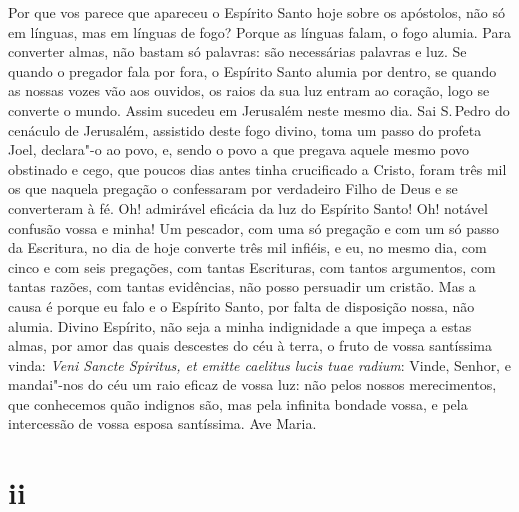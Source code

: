 Por que vos parece que apareceu o Espírito Santo hoje sobre os
apóstolos, não só em línguas, mas em línguas de fogo? Porque as línguas
falam, o fogo alumia. Para converter almas, não bastam só palavras: são
necessárias palavras e luz. Se quando o pregador fala por fora, o
Espírito Santo alumia por dentro, se quando as nossas vozes vão aos
ouvidos, os raios da sua luz entram ao coração, logo se converte o
mundo. Assim sucedeu em Jerusalém neste mesmo dia. Sai S.\,Pedro do
cenáculo de Jerusalém, assistido deste fogo divino, toma um passo do
profeta Joel, declara"-o ao povo, e, sendo o povo a que pregava aquele
mesmo povo obstinado e cego, que poucos dias antes tinha crucificado a
Cristo, foram três mil os que naquela pregação o confessaram por
verdadeiro Filho de Deus e se converteram à fé. Oh! admirável eficácia
da luz do Espírito Santo! Oh! notável confusão vossa e minha! Um
pescador, com uma só pregação e com um só passo da Escritura, no dia de
hoje converte três mil infiéis, e eu, no mesmo dia, com cinco e com seis
pregações, com tantas Escrituras, com tantos argumentos, com tantas
razões, com tantas evidências, não posso persuadir um cristão. Mas a
causa é porque eu falo e o Espírito Santo, por falta de disposição
nossa, não alumia. Divino Espírito, não seja a minha indignidade a que
impeça a estas almas, por amor das quais descestes do céu à terra, o
fruto de vossa santíssima vinda: \emph{Veni Sancte Spiritus, et emitte
caelitus lucis tuae radium}: Vinde, Senhor, e mandai"-nos do céu um raio
eficaz de vossa luz: não pelos nossos merecimentos, que conhecemos
quão indignos são, mas pela infinita bondade vossa, e pela intercessão
de vossa esposa santíssima. Ave Maria.

\section*{ii}

